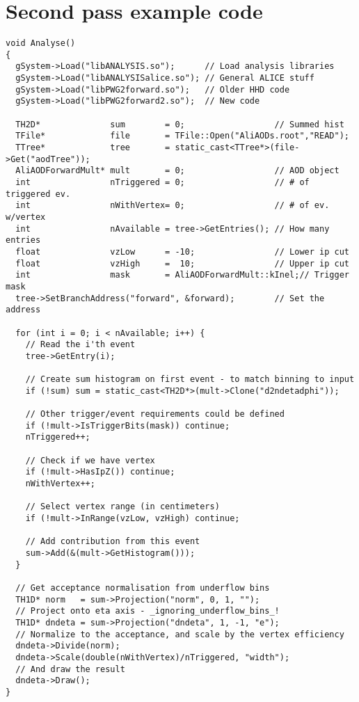 \documentclass[11pt]{article}
\newcommand{\dndeta}[1][]{{\ensuremath%
    \ifx|#1|\else\left.\fi%
    \frac{1}{N}\frac{dN_{ch}}{d\eta}%
    \ifx|#1|\else\right|_{#1}\fi%
}}
\begin{document}
\section{Second pass example code}
\begin{lstlisting}[caption={Example 2\textsuperscript{nd} pass code to
    do $\dndeta$},label={lst:example},frame=single,captionpos=b]
void Analyse()
{ 
  gSystem->Load("libANALYSIS.so");      // Load analysis libraries
  gSystem->Load("libANALYSISalice.so"); // General ALICE stuff
  gSystem->Load("libPWG2forward.so");   // Older HHD code
  gSystem->Load("libPWG2forward2.so");  // New code 

  TH2D*              sum        = 0;                  // Summed hist
  TFile*             file       = TFile::Open("AliAODs.root","READ");
  TTree*             tree       = static_cast<TTree*>(file->Get("aodTree"));
  AliAODForwardMult* mult       = 0;                  // AOD object
  int                nTriggered = 0;                  // # of triggered ev.
  int                nWithVertex= 0;                  // # of ev. w/vertex
  int                nAvailable = tree->GetEntries(); // How many entries
  float              vzLow      = -10;                // Lower ip cut
  float              vzHigh     =  10;                // Upper ip cut
  int                mask       = AliAODForwardMult::kInel;// Trigger mask
  tree->SetBranchAddress("forward", &forward);        // Set the address

  for (int i = 0; i < nAvailable; i++) { 
    // Read the i'th event 
    tree->GetEntry(i);

    // Create sum histogram on first event - to match binning to input
    if (!sum) sum = static_cast<TH2D*>(mult->Clone("d2ndetadphi"));
    
    // Other trigger/event requirements could be defined 
    if (!mult->IsTriggerBits(mask)) continue; 
    nTriggered++;

    // Check if we have vertex 
    if (!mult->HasIpZ()) continue;
    nWithVertex++;

    // Select vertex range (in centimeters) 
    if (!mult->InRange(vzLow, vzHigh) continue; 

    // Add contribution from this event
    sum->Add(&(mult->GetHistogram()));
  }

  // Get acceptance normalisation from underflow bins 
  TH1D* norm   = sum->Projection("norm", 0, 1, "");
  // Project onto eta axis - _ignoring_underflow_bins_!
  TH1D* dndeta = sum->Projection("dndeta", 1, -1, "e");
  // Normalize to the acceptance, and scale by the vertex efficiency 
  dndeta->Divide(norm);
  dndeta->Scale(double(nWithVertex)/nTriggered, "width");
  // And draw the result
  dndeta->Draw();
}
\end{lstlisting}
\end{document}
